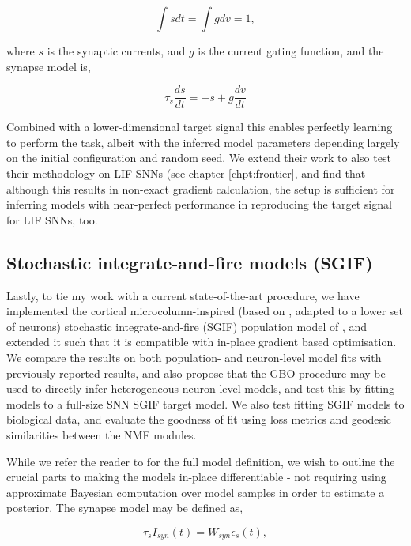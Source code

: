 \documentclass[mphil,deptreport,ianc]{infthesis} %
\begin{document}
\begin{equation}
    \int s dt = \int g dv = 1,
\end{equation}

where $s$ is the synaptic currents, and $g$ is the current gating function, and the synapse model is,

\begin{equation}
    \tau_s \frac{ds}{dt} = -s + g \frac{dv}{dt}
\end{equation}

Combined with a lower-dimensional target signal this enables perfectly learning to perform the task, albeit with the inferred model parameters depending largely on the initial configuration and random seed.
We extend their work to also test their methodology on LIF SNNs (see chapter \ref{chpt:frontier}, and find that although this results in non-exact gradient calculation, the setup is sufficient for inferring models with near-perfect performance in reproducing the target signal for LIF SNNs, too.

\subsection{Stochastic integrate-and-fire models (SGIF)}\label{microGIF}

Lastly, to tie my work with a current state-of-the-art procedure, we have implemented the cortical microcolumn-inspired (based on \cite{Schwalger2017}, adapted to a lower set of neurons) stochastic integrate-and-fire (SGIF) population model of \cite{Rene2020}, and extended it such that it is compatible with in-place gradient based optimisation. 
We compare the results on both population- and neuron-level model fits with previously reported results, and also propose that the GBO procedure may be used to directly infer heterogeneous neuron-level models, and test this by fitting models to a full-size SNN SGIF target model.
We also test fitting SGIF models to biological data, and evaluate the goodness of fit using loss metrics and geodesic similarities between the NMF modules.

While we refer the reader to \cite{Rene2020} for the full model definition, we wish to outline the crucial parts to making the models in-place differentiable - not requiring using approximate Bayesian computation over model samples in order to estimate a posterior.
The synapse model may be defined as,

\begin{equation}
    \tau_s I_{syn}(t) = W_{syn} \epsilon_s(t),
\end{equation}
\end{document}
